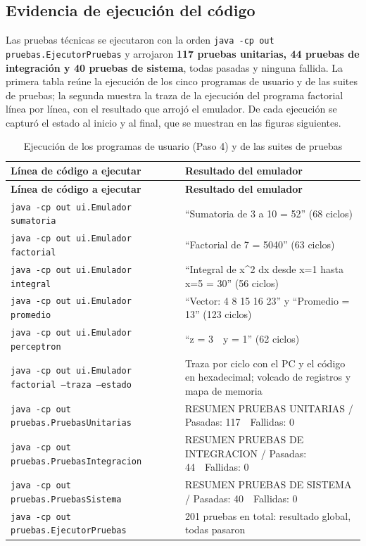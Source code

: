 \documentclass[11pt,letterpaper,oneside]{article}
\begin{document}
\subsection{Evidencia de ejecución del código}

Las pruebas técnicas se ejecutaron con la orden
\texttt{java -cp out pruebas.EjecutorPruebas} y arrojaron \textbf{117 pruebas
unitarias, 44 pruebas de integración y 40 pruebas de sistema}, todas pasadas y
ninguna fallida. La primera tabla reúne la ejecución de los cinco programas de
usuario y de las suites de pruebas; la segunda muestra la traza de la
ejecución del programa factorial línea por línea, con el resultado que arrojó
el emulador. De cada ejecución se capturó el estado al inicio y al final, que
se muestran en las figuras siguientes.

\begin{longtable}{@{}p{7.2cm} p{7.6cm}@{}}
\caption{Ejecución de los programas de usuario (Paso 4) y de las suites de pruebas}\label{tab:comandos}\\
\toprule
\textbf{Línea de código a ejecutar} & \textbf{Resultado del emulador}\\
\midrule
\endfirsthead
\toprule
\textbf{Línea de código a ejecutar} & \textbf{Resultado del emulador}\\
\midrule
\endhead
\texttt{java -cp out ui.Emulador sumatoria}   & ``Sumatoria de 3 a 10 = 52'' (68 ciclos)\\
\texttt{java -cp out ui.Emulador factorial}   & ``Factorial de 7 = 5040'' (63 ciclos)\\
\texttt{java -cp out ui.Emulador integral}    & ``Integral de x\^{}2 dx desde x=1 hasta x=5 = 30'' (56 ciclos)\\
\texttt{java -cp out ui.Emulador promedio}    & ``Vector: 4 8 15 16 23'' y ``Promedio = 13'' (123 ciclos)\\
\texttt{java -cp out ui.Emulador perceptron}  & ``z = 3\ \ y = 1'' (62 ciclos)\\
\texttt{java -cp out ui.Emulador factorial --traza --estado} & Traza por ciclo con el PC y el código en hexadecimal; volcado de registros y mapa de memoria\\
\texttt{java -cp out pruebas.PruebasUnitarias}    & RESUMEN PRUEBAS UNITARIAS / Pasadas: 117\ \ Fallidas: 0\\
\texttt{java -cp out pruebas.PruebasIntegracion}  & RESUMEN PRUEBAS DE INTEGRACION / Pasadas: 44\ \ Fallidas: 0\\
\texttt{java -cp out pruebas.PruebasSistema}      & RESUMEN PRUEBAS DE SISTEMA / Pasadas: 40\ \ Fallidas: 0\\
\texttt{java -cp out pruebas.EjecutorPruebas}     & 201 pruebas en total: resultado global, todas pasaron\\
\bottomrule
\end{longtable}
\end{document}
